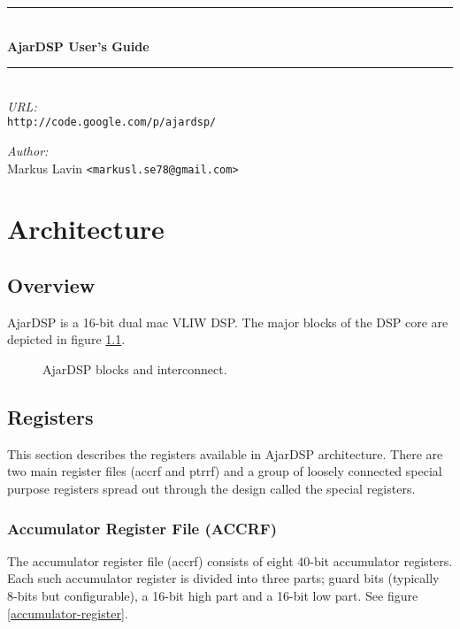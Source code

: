 \documentclass[11pt]{book}
\newcommand{\HRule}{\rule{\linewidth}{0.5mm}}
\begin{document}
\begin{titlepage}
\begin{center}
\HRule \\[0.4cm]
{\Huge \textbf{AjarDSP User's Guide}}\\[0.8cm]
\HRule \\[1.5cm]
\emph{URL:}\\
\texttt{http://code.google.com/p/ajardsp/}\\
\vfill
\begin{flushleft}
\begin{minipage}{0.4\textwidth}
\begin{flushleft} \large
\emph{Author:}\\
Markus Lavin \texttt{<markusl.se78@gmail.com>}
\end{flushleft}
\end{minipage}
\end{flushleft}
\end{center}
\end{titlepage}

\tableofcontents

\chapter{Architecture}
\section{Overview}
AjarDSP is a 16-bit dual mac VLIW DSP. The major blocks of the DSP
core are depicted in figure \ref{ajardsp-blocks}.
\begin{figure}[!h]
  \caption{\small AjarDSP blocks and interconnect.}
  \label{ajardsp-blocks}
\end{figure}
\section{Registers}
This section describes the registers available in AjarDSP
architecture. There are two main register files (accrf and ptrrf) and
a group of loosely connected special purpose registers spread out
through the design called the special registers.
\subsection{Accumulator Register File (ACCRF)}
The accumulator register file (accrf) consists of eight 40-bit
accumulator registers. Each such accumulator register is divided into
three parts; guard bits (typically 8-bits but configurable), a 16-bit
high part and a 16-bit low part. See figure
\ref{accumulator-register}.  \break
\end{document}
